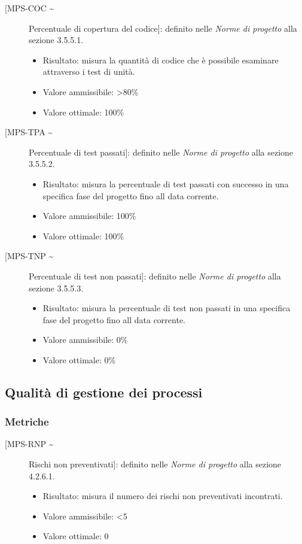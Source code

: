 \documentclass[../piano-di-qualifica.tex]{subfiles}
\begin{document}
\begin{description}
  \item [[MPS-COC \textasciitilde] Percentuale di copertura del codice]: definito nelle \textit{Norme di progetto} alla sezione 3.5.5.1.
        \begin{itemize} \item Risultato: misura la quantità di codice che è possibile esaminare attraverso i test di unità. \item Valore ammissibile: >80\% \item Valore ottimale: 100\% \end{itemize}
  \item [[MPS-TPA \textasciitilde] Percentuale di test passati]: definito nelle \textit{Norme di progetto} alla sezione 3.5.5.2.
        \begin{itemize} \item Risultato: misura la percentuale di test passati con successo in una specifica fase del progetto fino all data corrente. \item Valore ammissibile: 100\% \item Valore ottimale: 100\% \end{itemize}
  \item [[MPS-TNP \textasciitilde] Percentuale di test non passati]: definito nelle \textit{Norme di progetto} alla sezione 3.5.5.3.
        \begin{itemize} \item Risultato: misura la percentuale di test non passati in una specifica fase del progetto fino all data corrente. \item Valore ammissibile: 0\% \item Valore ottimale: 0\% \end{itemize}

\end{description}



\subsection{Qualità di gestione dei processi}%
\label{subsec:qualita_gestione_processi}

\subsubsection{Metriche}%
\label{subsec:metriche_ver}

\begin{description}
  \item [[MPS-RNP \textasciitilde] Rischi non preventivati]: definito nelle \textit{Norme di progetto} alla sezione 4.2.6.1.
        \begin{itemize} \item Risultato: misura il numero dei rischi non preventivati incontrati. \item Valore ammissibile: <5 \item Valore ottimale: 0 \end{itemize}
\end{description}
\end{document}
